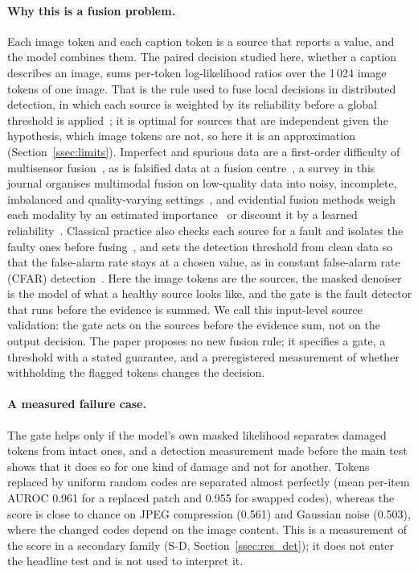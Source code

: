 \paragraph{Why this is a fusion problem.}
Each image token and each caption token is a source that reports a value, and the model combines them.
The paired decision studied here, whether a caption describes an image, sums per-token log-likelihood ratios over the 1\,024
image tokens of one image.
That is the rule used to fuse local decisions in distributed detection, in which each source is weighted by its reliability
before a global threshold is applied~\cite{chair1986optimal,tenney1981detection}; it is optimal for sources that are independent
given the hypothesis, which image tokens are not, so here it is an approximation (Section~\ref{ssec:limits}).
Imperfect and spurious data are a first-order difficulty of multisensor fusion~\cite{khaleghi2013multisensor}, as is falsified data
at a fusion centre~\cite{vempaty2013byzantine},
a survey in this journal organises multimodal fusion on low-quality data into noisy, incomplete, imbalanced and quality-varying
settings~\cite{zhang2026lowquality}, and evidential fusion methods weigh each modality by an estimated importance~\cite{shao2024ddef} or discount it by a learned
reliability~\cite{huang2025evidential}.
Classical practice also checks each source for a fault and isolates the faulty ones before fusing~\cite{willsky1976survey,gao2015survey},
and sets the detection threshold from clean data so that the false-alarm rate stays at a chosen value, as in constant false-alarm
rate (CFAR) detection~\cite{finn1968adaptive,rohling1983cfar}.
Here the image tokens are the sources, the masked denoiser is the model of what a healthy source looks like, and the gate is the
fault detector that runs before the evidence is summed.
We call this input-level source validation: the gate acts on the sources before the evidence sum, not on the output decision.
The paper proposes no new fusion rule; it specifies a gate, a threshold with a stated guarantee, and a preregistered measurement
of whether withholding the flagged tokens changes the decision.

\paragraph{A measured failure case.}
The gate helps only if the model's own masked likelihood separates damaged tokens from intact ones, and a detection measurement
made before the main test shows that it does so for one kind of damage and not for another.
Tokens replaced by uniform random codes are separated almost perfectly (mean per-item AUROC 0.961 for a replaced patch and 0.955
for swapped codes), whereas the score is close to chance on JPEG compression (0.561) and Gaussian noise (0.503), where the changed
codes depend on the image content.
This is a measurement of the score in a secondary family (S-D, Section~\ref{ssec:res_det}); it does not enter the headline test and
is not used to interpret it.

